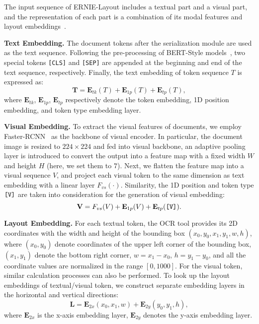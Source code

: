 \documentclass[11pt]{article}
\begin{document}
The input sequence of ERNIE-Layout includes a textual part and a visual part, and the representation of each part is a combination of its modal features and layout embeddings~\cite{xu2021layoutlmv2}.

\noindent\textbf{Text Embedding.}
The document tokens after the serialization module are used as the text sequence. 
Following the pre-processing of BERT-Style models~\cite{devlin2019bert}, two special tokens \verb|[CLS]| and \verb|[SEP]| are appended at the beginning and end of the text sequence, respectively. 
Finally, the text embedding of token sequence $T$ is expressed as:
\begin{equation}
    \textbf{T}= \textbf{E}_{tk}(T) + \textbf{E}_{1p}(T) + \textbf{E}_{tp}(T),
\end{equation}
where $\textbf{E}_{tk}$, $\textbf{E}_{1p}$, $\textbf{E}_{tp}$ respectively denote the token embedding, 1D position embedding, and token type embedding layer. 


\noindent\textbf{Visual Embedding.}
To extract the visual features of documents, we employ Faster-RCNN~\cite{ren2015faster} as the backbone of visual encoder.
In particular, the document image is resized to $224 \times 224$ and fed into visual backbone, an adaptive pooling layer is introduced to convert the output into a feature map with a fixed width $W$ and height $H$ (here, we set them to $7$).
Next, we flatten the feature map into a visual sequence $V$, and project each visual token to the same dimension as text embedding with a linear layer $F_{vs}(\cdot)$. 
Similarity, the 1D position and token type $\verb|[V]|$ are taken into consideration for the generation of visual embedding:
\begin{equation}
    \textbf{V}= F_{vs}(V) + \textbf{E}_{1p}(V) + \textbf{E}_{tp}(\verb|[V]|).
\end{equation}

\noindent\textbf{Layout Embedding.}
For each textual token, the OCR tool provides its 2D  coordinates with the width and height of the bounding box $(x_0, y_0, x_1, y_1, w, h)$,
where $(x_0, y_0)$ denote coordinates of the upper left corner of the bounding box, $(x_1, y_1)$ denote the bottom right corner, $w = x_1 - x_0$, $h = y_1 - y_0$, and all the coordinate values are normalized in the range $[0, 1000]$.
For the visual token, similar calculation processes can also be performed.
To look up the layout embeddings of textual/visual token, we construct separate embedding layers in the horizontal and vertical directions:
\begin{equation}
\textbf{L} = \textbf{E}_{2x}(x_0 ,x_1, w) + \textbf{E}_{2y}(y_0, y_1, h),
\end{equation}
where $\textbf{E}_{2x}$ is the x-axis embedding layer, $\textbf{E}_{2y}$ denotes the y-axis embedding layer.
\end{document}

